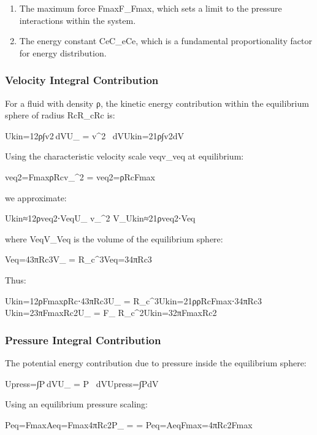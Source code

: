 {\begin{enumerate}
\item The maximum force Fmax⁡F_{\max}Fmax​, which sets a limit to the pressure interactions within the system.


\item The energy constant CeC_eCe​, which is a fundamental proportionality factor for energy distribution.


\end{enumerate}
\subsubsection*{Velocity Integral Contribution}
For a fluid with density ρ, the kinetic energy contribution within the equilibrium sphere of radius RcR_cRc​ is:

Ukin=12ρ∫v2 dVU_{} =  \rho \int v^2 \, dVUkin​=21​ρ∫v2dV

Using the characteristic velocity scale veqv_{}veq​ at equilibrium:

veq2=Fmax⁡ρRcv_{}^2 = veq2​=ρRc​Fmax​​

we approximate:

Ukin≈12ρveq2⋅VeqU_{} \approx {} \rho v_{}^2 \cdot V_{}Ukin​≈21​ρveq2​⋅Veq​

where VeqV_{}Veq​ is the volume of the equilibrium sphere:

Veq=43πRc3V_{} =  \pi R_c^3Veq​=34​πRc3​

Thus:

Ukin=12ρFmax⁡ρRc⋅43πRc3U_{} =  \rho {} \cdot {} \pi R_c^3Ukin​=21​ρρRc​Fmax​​⋅34​πRc3​ Ukin=23πFmax⁡Rc2U_{} =  \pi F_{\max} R_c^2Ukin​=32​πFmax​Rc2​



\subsubsection*{Pressure Integral Contribution}
The potential energy contribution due to pressure inside the equilibrium sphere:

Upress=∫P dVU_{} = \int P \, dVUpress​=∫PdV

Using an equilibrium pressure scaling:

Peq=Fmax⁡Aeq=Fmax⁡4πRc2P_{} =  = Peq​=Aeq​Fmax​​=4πRc2​Fmax​​

}
